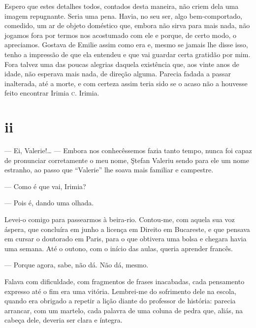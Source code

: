 Espero que estes detalhes todos, contados desta maneira, não criem dela
uma imagem repugnante. Seria uma pena. Havia, no seu ser, algo
bem-comportado, comedido, um ar de objeto doméstico que, embora não
sirva para mais nada, não jogamos fora por termos nos acostumado com ele
e porque, de certo modo, o apreciamos. Gostava de Emilie assim como era
e, mesmo se jamais lhe disse isso, tenho a impressão de que ela entendeu
e que vai guardar certa gratidão por mim. Fora talvez uma das poucas
alegrias daquela existência que, aos vinte anos de idade, não esperava
mais nada, de direção alguma. Parecia fadada a passar inalterada, até a
morte, e com certeza assim teria sido se o acaso não a houvesse feito
encontrar Irimia \textsc{c}. Irimia.

\section{ii}

 

--- Ei, Valerie!\ldots{} --- Embora nos conhecêssemos fazia tanto tempo,
nunca foi capaz de pronunciar corretamente o meu nome, Ştefan Valeriu
sendo para ele um nome estranho, ao passo que ``Valerie'' lhe soava mais
familiar e campestre.


--- Como é que vai, Irimia?

--- Pois é, dando uma olhada.


Levei-o comigo para passearmos à beira-rio. Contou-me, com aquela sua
voz áspera, que concluíra em junho a licença em Direito em Bucareste, e
que pensava em cursar o doutorado em Paris, para o que obtivera uma
bolsa e chegara havia uma semana. Até o outono, com o início das aulas,
queria aprender francês.

--- Porque agora, sabe, não dá. Não dá, mesmo.

Falava com dificuldade, com fragmentos de frases inacabadas, cada
pensamento expresso até o fim era uma vitória. Lembrei-me do sofrimento
dele na escola, quando era obrigado a repetir a lição diante do
professor de história: parecia arrancar, com um martelo, cada palavra de
uma coluna de pedra que, aliás, na cabeça dele, deveria ser clara e
íntegra.

